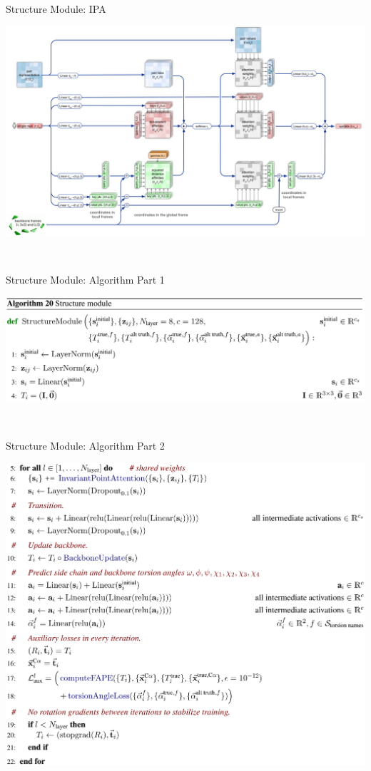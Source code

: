 \documentclass[presentation, smaller]{beamer}
\begin{document}
\begin{frame}[label={sec:orgd2a5d92}]{Structure Module: IPA}
\begin{center}
\includegraphics[width=.9\linewidth]{./imgs/ipa.png}
\end{center}~\cite{jumperHighlyAccurateProtein2021}
\end{frame}

\begin{frame}[label={sec:org67dc9c3}]{Structure Module: Algorithm Part 1}
\begin{center}
\includegraphics[width=.9\linewidth]{./imgs/algo20-part1.png}
\end{center}~\cite{jumperHighlyAccurateProtein2021}
\end{frame}

\begin{frame}[label={sec:org33a23ed}]{Structure Module: Algorithm Part 2}
\begin{center}
\includegraphics[width=.9\linewidth]{./imgs/algo20-part2.png}
\end{center}~\cite{jumperHighlyAccurateProtein2021}
\end{frame}
\end{document}
